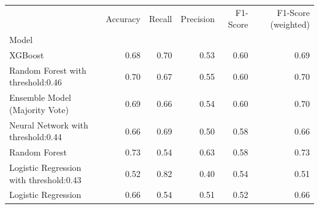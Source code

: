 \begin{tabular}{lrrrrr}
\toprule
 & Accuracy & Recall & Precision & F1-Score & F1-Score (weighted) \\
Model &  &  &  &  &  \\
\midrule
XGBoost & 0.68 & 0.70 & 0.53 & 0.60 & 0.69 \\
Random Forest with threshold:0.46 & 0.70 & 0.67 & 0.55 & 0.60 & 0.70 \\
Ensemble Model (Majority Vote) & 0.69 & 0.66 & 0.54 & 0.60 & 0.70 \\
Neural Network with threshold:0.44 & 0.66 & 0.69 & 0.50 & 0.58 & 0.66 \\
Random Forest & 0.73 & 0.54 & 0.63 & 0.58 & 0.73 \\
Logistic Regression with threshold:0.43 & 0.52 & 0.82 & 0.40 & 0.54 & 0.51 \\
Logistic Regression & 0.66 & 0.54 & 0.51 & 0.52 & 0.66 \\
\bottomrule
\end{tabular}
